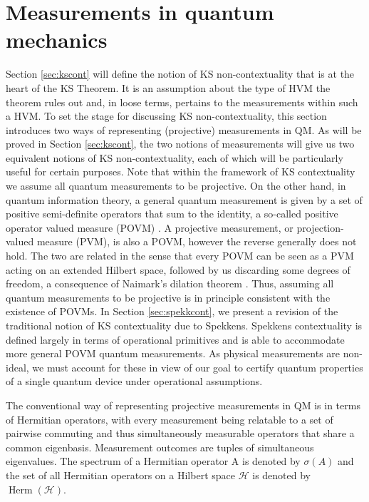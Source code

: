 \section{Measurements in quantum mechanics}
\label{sec:mnts}
Section \ref{sec:kscont} will define the notion of KS non-contextuality that is at the heart of the KS Theorem. It is an assumption about the type of HVM the theorem rules out and, in loose terms, pertains to the measurements within such a HVM. To set the stage for discussing KS non-contextuality, this section introduces two ways of representing (projective) measurements in QM. As will be proved in Section \ref{sec:kscont}, the two notions of measurements will give us two equivalent notions of KS non-contextuality, each of which will be particularly useful for certain purposes. Note that within the framework of KS contextuality we assume all quantum measurements to be projective. On the other hand, in quantum information theory, a general quantum measurement is given by a set of positive semi-definite operators that sum to the identity, a so-called positive operator valued measure (POVM) \cite{Nielsen2010}. A projective measurement, or projection-valued measure (PVM), is also a POVM, however the reverse generally does not hold. The two are related in the sense that every POVM can be seen as a PVM acting on an extended Hilbert space, followed by us discarding some degrees of freedom, a consequence of Naimark's dilation theorem \cite{Watrous2018}. Thus, assuming all quantum measurements to be projective is in principle consistent with the existence of POVMs. In Section \ref{sec:spekkcont}, we present a revision of the traditional notion of KS contextuality due to Spekkens. Spekkens contextuality is defined largely in terms of operational primitives and is able to accommodate more general POVM quantum measurements. As physical measurements are non-ideal, we must account for these in view of our goal to certify quantum properties of a single quantum device under operational assumptions.

The conventional way of representing projective measurements in QM is in terms of Hermitian operators, with every measurement being relatable to a set of pairwise commuting and thus simultaneously measurable operators that share a common eigenbasis. Measurement outcomes are tuples of simultaneous eigenvalues. The spectrum of a Hermitian operator A is denoted by $\sigma(A)$ and the set of all Hermitian operators on a Hilbert space $\mathcal{H}$ is denoted by $\operatorname{Herm}(\mathcal{H})$. 

